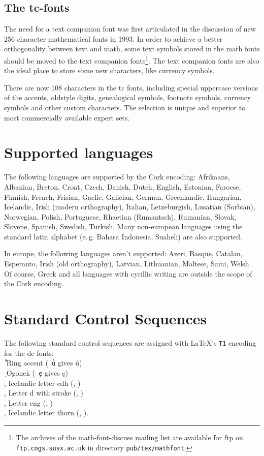 \documentclass{article}
\renewcommand{\-}{\discretionary{\char'0177 }{}{}}
\begin{document}
\subsection{The \textsf{tc}-fonts}
The need for a text companion font was first articulated in the discussion 
of new 256 character mathematical fonts in 1993. In order to achieve a 
better orthogonality between text and math, some text 
symbols stored in the math fonts should be moved to the text companion 
fonts\footnote{The archives of the 
math-font-discuss mailing list are available for ftp on 
\texttt{ftp.cogs.susx.ac.uk} in directory \texttt{pub/tex/mathfont}.}. 
The text companion fonts are also the ideal place to store some new 
characters, like currency symbols.
 
There are now 108 characters in the \textsf{tc} fonts, including 
special uppercase versions of the accents, oldstyle digits,
genealogical symbols, footnote symbols, currency symbols and 
other custom characters. The selection is unique and superior 
to most commercially available expert sets.
 
\section{Supported languages}
The following languages are supported by the Cork encoding:
Afrikaans, Albanian, Breton, Croat, Czech, Danish, Dutch, English, Estonian, 
Faroese, Fin\-nish, French, Frisian, Gaelic, Galician, German, Greenlandic,
Hungarian, Icelandic, Irish (modern orthography), Italian, Letzeburgish,
Lusatian (Sorbian), Norwegian, Polish, Portuguese, Rhaetian (Rumantsch), 
Rumanian, Slovak, Slo\-ve\-ne, Spanish, Swedish, Turkish. Many non-european 
languages using the standard latin alphabet (e.\,g. Bahasa Indonesia, 
Suaheli) are also supported.

In europe, the following languages aren't supported: Azeri, Basque, 
Catalan, Esperanto, Irish (old orthography), Latvian, Lithuanian, Maltese, 
Sami, Welsh. Of course, Greek and all languages with cyrillic writing are 
outside the scope of the Cork encoding.

\section{Standard Control Sequences}

The following standard control sequences are assigned with \LaTeX's 
\texttt{T1} encoding for the \textsf{dc} fonts:\\
\texttt{\string\r} Ring accent (\texttt{\string\r\ u} gives \r{u})\\
\texttt{\string\k} Ogonek (\texttt{\string\k\ e} gives \k{e})\\
\texttt{\string\dh}, \texttt{\string\DH} Icelandic letter edh (\dh, \DH)\\
\texttt{\string\dj}, \texttt{\string\DJ} Letter d with stroke (\dj, \DJ)\\
\texttt{\string\ng}, \texttt{\string\NG} Letter eng (\ng, \NG)\\
\texttt{\string\th}, \texttt{\string\TH} Icelandic letter thorn (\th, \TH).\\
\end{document}
